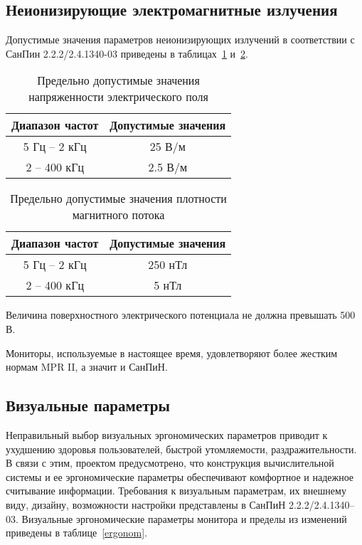 \subsection{Неионизирующие электромагнитные излучения}

Допустимые значения параметров неионизирующих излучений в соответствии с СанПин 2.2.2/2.4.1340-03 приведены в таблицах~\ref{tab:U} и~\ref{tab:ro}.

\begin{table}[ht]
\caption{Предельно допустимые значения напряженности электрического поля}
\begin{tabular}{|c|c|}
\hline
Диапазон частот& Допустимые значения \\
\hline
5 Гц -- 2 кГц & 25 В/м \\
\hline
2 -- 400 кГц& 2.5 В/м \\
\hline
\end{tabular}
\label{tab:U}
\end{table}

\begin{table}[ht]
\caption{Предельно допустимые значения плотности магнитного потока}
\begin{tabular}{|c|c|}
\hline
Диапазон частот& Допустимые значения \\
\hline
5 Гц -- 2 кГц & 250 нТл \\
\hline
2 -- 400 кГц& 5 нТл \\
\hline
\end{tabular}
\label{tab:ro}
\end{table}

Величина поверхностного электрического потенциала не должна превышать 500 В.

Мониторы, используемые в настоящее время, удовлетворяют более жестким нормам MPR II, а значит и СанПиН.

\subsection{Визуальные параметры}

Неправильный выбор визуальных эргономических параметров приводит к ухудшению здоровья пользователей, быстрой утомляемости, раздражительности. В связи с этим, проектом предусмотрено, что конструкция вычислительной системы и ее эргономические параметры обеспечивают комфортное и надежное считывание информации. Требования к визуальным параметрам, их внешнему виду, дизайну, возможности настройки представлены в СанПиН 2.2.2/2.4.1340--03. Визуальные эргономические параметры монитора и пределы из изменений приведены в таблице~\ref{ergonom}.


